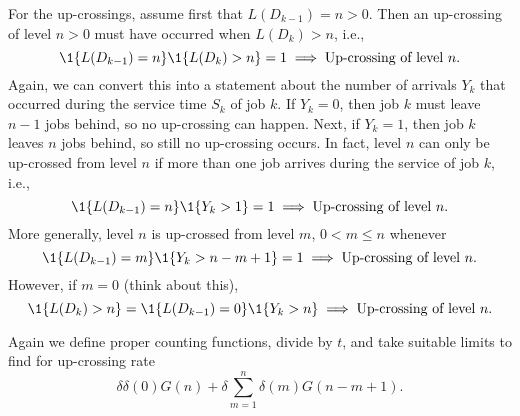 For the up-crossings, assume first that $L(D_{k-1})=n>0$.  Then an up-crossing of level $n>0$  must have occurred when $L(D_k)>n$, i.e., 
 \begin{equation*}
 \1{L(D_{k-1}) = n}\1{L(D_k)>n} = 1 \implies   \text{Up-crossing of level $n$}.
 \end{equation*}
Again, we can convert this into a statement about  the number of
arrivals $Y_k$ that occurred during the service time $S_k$ of job $k$.  If $Y_k=0$, then
job $k$ must leave $n-1$ jobs behind, so no up-crossing can
happen. Next, if $Y_k=1$, then job $k$ leaves $n$ jobs behind, so
still no up-crossing occurs. In fact, level $n$ can only be  up-crossed from level $n$ if
more than one job arrives during the service of job $k$, i.e.,
\begin{equation*}
\1{L(D_{k-1})=n} \1{Y_{k}>1} = 1 \implies   \text{Up-crossing of level $n$}.
\end{equation*}
More generally, level $n$ is up-crossed from level $m$, $0<m\leq n$ whenever
\begin{equation*}
\1{L(D_{k-1})=m} \1{Y_{k}>n-m+1} = 1 \implies   \text{Up-crossing of level $n$}.
\end{equation*}
However,  if $m=0$ (think about this),
\begin{equation*}
\1{L(D_{k})>n} = \1{L(D_{k-1})=0} \1{Y_{k}>n}   \implies   \text{Up-crossing of level $n$}.
\end{equation*}

Again we define proper counting functions,  divide by $t$, and take suitable limits to find for up-crossing rate
\begin{equation}\label{eq:555}
\delta \delta(0) G(n) + \delta \sum_{m=1}^n \delta(m) G(n-m+1).
\end{equation}

